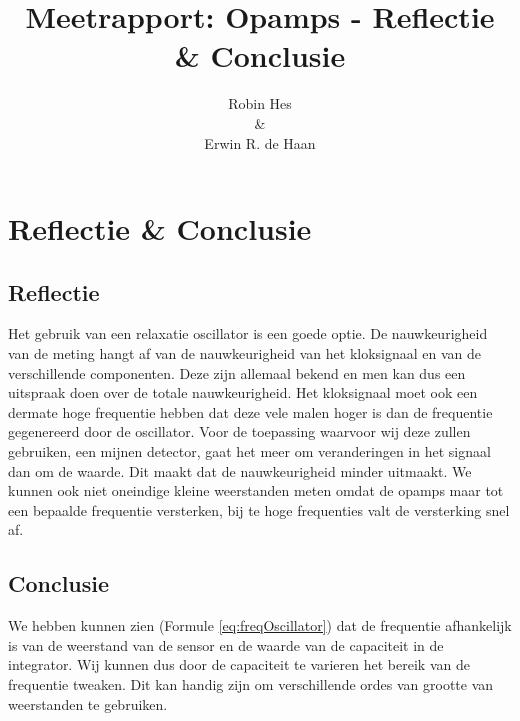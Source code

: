 \documentclass{report}
\title{Meetrapport: Opamps - Reflectie \& Conclusie}
\author{Robin Hes\\\&\\Erwin R. de Haan}
\begin{document}
\chapter{Reflectie \& Conclusie}
\section{Reflectie}
Het gebruik van een relaxatie oscillator is een goede optie. De nauwkeurigheid van de meting hangt af van de nauwkeurigheid van het kloksignaal en van de verschillende componenten. Deze zijn allemaal bekend en men kan dus een uitspraak doen over de totale nauwkeurigheid. Het kloksignaal moet ook een dermate hoge frequentie hebben dat deze vele malen hoger is dan de frequentie gegenereerd door de oscillator. Voor de toepassing waarvoor wij deze zullen gebruiken, een mijnen detector, gaat het meer om veranderingen in het signaal dan om de waarde. Dit maakt dat de nauwkeurigheid minder uitmaakt. We kunnen ook niet oneindige kleine weerstanden meten omdat de opamps maar tot een bepaalde frequentie versterken, bij te hoge frequenties valt de versterking snel af.
\section{Conclusie}
We hebben kunnen zien (Formule \ref{eq:freqOscillator}) dat de frequentie afhankelijk is van de weerstand van de sensor en de waarde van de capaciteit in de integrator. Wij kunnen dus door de capaciteit te varieren het bereik van de frequentie tweaken. Dit kan handig zijn om verschillende ordes van grootte van weerstanden te gebruiken.
\end{document}
